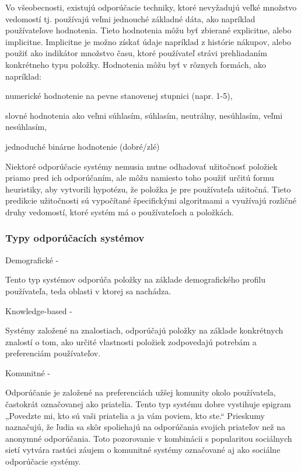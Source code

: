 Vo všeobecnosti, existujú odporúčacie techniky, ktoré nevyžadujú veľké množstvo vedomostí tj. používajú veľmi jednouché základné dáta, ako napríklad používateľove hodnotenia. Tieto hodnotenia môžu byť zbierané explicitne, alebo implicitne. Implicitne je možno získať údaje napríklad z histórie nákupov, alebo použiť ako indikátor množstvo času, ktoré používateľ strávi prehliadaním konkrétneho typu položky. Hodnotenia môžu byť v rôznych formách, ako napríklad: \cite{rs1}
 \begin{itemize}[leftmargin=*]
{\item numerické hodnotenie na pevne stanovenej stupnici (napr. 1-5),} 
{\item slovné hodnotenia ako veľmi súhlasím, súhlasím, neutrálny, nesúhlasím, veľmi nesúhlasím,} 
{\item jednoduché binárne hodnotenie (dobré/zlé)} \cite{rs1}
\end{itemize} 

Niektoré odporúčacie systémy nemusia nutne odhadovať užitočnosť položiek priamo pred ich odporúčaním, ale môžu namiesto toho použiť určitú formu heuristiky, aby vytvorili hypotézu, že položka je pre používateľa užitočná. Tieto predikcie užitočnosti sú vypočítané špecifickými algoritmami a využívajú rozličné druhy vedomostí, ktoré systém má o používateľoch a položkách. \cite{rs1} \\

\subsubsection{Typy odporúčacích systémov}
\begin{itemize}[leftmargin=*]
{\bf \item Demografické - }Tento typ systémov odporúča položky na základe demografického
profilu používateľa, teda oblasti v ktorej sa nachádza. 
{\bf \item Knowledge-based - }Systémy založené na znalostiach, odporúčajú položky na základe konkrétnych znalostí o tom, ako určité vlastnosti položiek zodpovedajú potrebám a preferenciám používateľov.
{\bf \item Komunitné - }Odporúčanie je založené na preferenciách užšej komunity okolo používateľa, častokrát označovanej ako priatelia. Tento typ systému dobre vystihuje epigram „Povedzte mi, kto sú vaši priatelia a ja vám poviem, kto ste.“ Prieskumy naznačujú, že ľudia sa skôr spoliehajú na odporúčania svojich priateľov než na anonymné odporúčania. \cite{communityrec} Toto pozorovanie v kombinácii s popularitou sociálnych sietí vytvára rastúci záujem o komunitné systémy označované aj ako sociálne odporúčacie systémy. \cite{rs1}\\
\end{itemize} 
 
